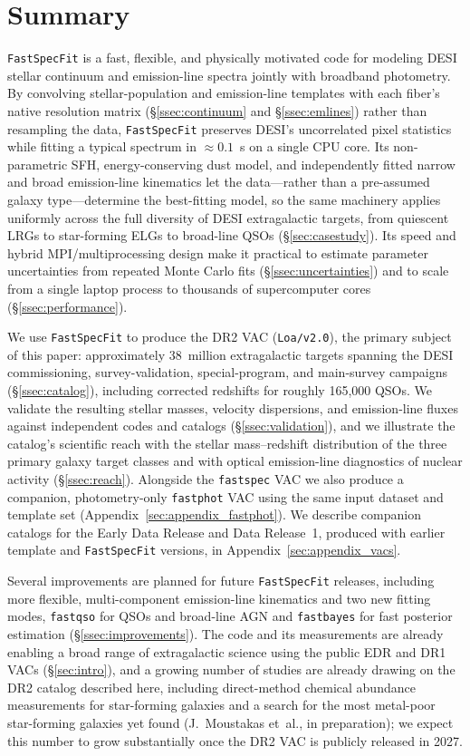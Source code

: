 \documentclass[modern,linenumbers]{aastex702}
\newcommand{\fastspecfit}{\texttt{FastSpecFit}}
\newcommand{\fastspec}{\texttt{fastspec}}
\newcommand{\fastphot}{\texttt{fastphot}}
\begin{document}
\section{Summary}
\label{sec:summary}

\fastspecfit{} is a fast, flexible, and physically motivated code for
modeling DESI stellar continuum and emission-line spectra jointly with
broadband photometry. By convolving stellar-population and
emission-line templates with each fiber's native resolution matrix
(\S\ref{ssec:continuum} and \S\ref{ssec:emlines}) rather than
resampling the data, \fastspecfit{} preserves DESI's uncorrelated
pixel statistics while fitting a typical spectrum in $\approx0.1$~s on
a single CPU core. Its non-parametric SFH, energy-conserving dust
model, and independently fitted narrow and broad emission-line
kinematics let the data---rather than a pre-assumed galaxy
type---determine the best-fitting model, so the same machinery applies
uniformly across the full diversity of DESI extragalactic targets,
from quiescent LRGs to star-forming ELGs to broad-line QSOs
(\S\ref{sec:casestudy}). Its speed and hybrid MPI/multiprocessing
design make it practical to estimate parameter uncertainties from
repeated Monte Carlo fits (\S\ref{ssec:uncertainties}) and to scale
from a single laptop process to thousands of supercomputer cores
(\S\ref{ssec:performance}).

We use \fastspecfit{} to produce the DR2 VAC (\texttt{Loa/v2.0}), the
primary subject of this paper: approximately 38~million extragalactic
targets spanning the DESI commissioning, survey-validation,
special-program, and main-survey campaigns (\S\ref{ssec:catalog}),
including corrected redshifts for roughly 165,000 QSOs. We validate
the resulting stellar masses, velocity dispersions, and emission-line
fluxes against independent codes and catalogs
(\S\ref{ssec:validation}), and we illustrate the catalog's scientific
reach with the stellar mass--redshift distribution of the three
primary galaxy target classes and with optical emission-line
diagnostics of nuclear activity (\S\ref{ssec:reach}). Alongside the
\fastspec{} VAC we also produce a companion, photometry-only
\fastphot{} VAC using the same input dataset and template set
(Appendix~\ref{sec:appendix_fastphot}). We describe companion catalogs
for the Early Data Release and Data Release~1, produced with earlier
template and \fastspecfit{} versions, in
Appendix~\ref{sec:appendix_vacs}.

Several improvements are planned for future \fastspecfit{} releases,
including more flexible, multi-component emission-line kinematics and
two new fitting modes, \texttt{fastqso} for QSOs and broad-line AGN
and \texttt{fastbayes} for fast posterior estimation
(\S\ref{ssec:improvements}). The code and its measurements are already
enabling a broad range of extragalactic science using the public EDR
and DR1 VACs (\S\ref{sec:intro}), and a growing number of studies are
already drawing on the DR2 catalog described here, including
direct-method chemical abundance measurements for star-forming
galaxies \citep{scholte26a} and a search for the most metal-poor
star-forming galaxies yet found (J.~Moustakas et~al., in preparation);
we expect this number to grow substantially once the DR2 VAC is
publicly released in 2027.
\end{document}
